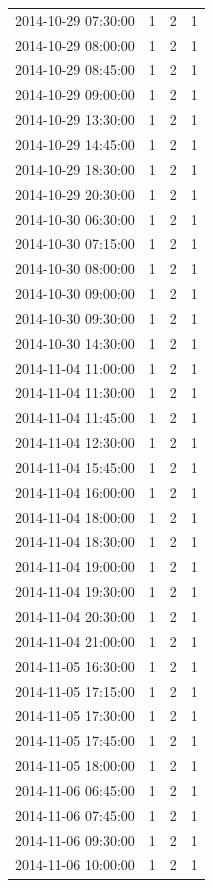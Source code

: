 \begin{tabular}{lrrr}
2014-10-29 07:30:00 & 1 & 2 & 1 \\
2014-10-29 08:00:00 & 1 & 2 & 1 \\
2014-10-29 08:45:00 & 1 & 2 & 1 \\
2014-10-29 09:00:00 & 1 & 2 & 1 \\
2014-10-29 13:30:00 & 1 & 2 & 1 \\
2014-10-29 14:45:00 & 1 & 2 & 1 \\
2014-10-29 18:30:00 & 1 & 2 & 1 \\
2014-10-29 20:30:00 & 1 & 2 & 1 \\
2014-10-30 06:30:00 & 1 & 2 & 1 \\
2014-10-30 07:15:00 & 1 & 2 & 1 \\
2014-10-30 08:00:00 & 1 & 2 & 1 \\
2014-10-30 09:00:00 & 1 & 2 & 1 \\
2014-10-30 09:30:00 & 1 & 2 & 1 \\
2014-10-30 14:30:00 & 1 & 2 & 1 \\
2014-11-04 11:00:00 & 1 & 2 & 1 \\
2014-11-04 11:30:00 & 1 & 2 & 1 \\
2014-11-04 11:45:00 & 1 & 2 & 1 \\
2014-11-04 12:30:00 & 1 & 2 & 1 \\
2014-11-04 15:45:00 & 1 & 2 & 1 \\
2014-11-04 16:00:00 & 1 & 2 & 1 \\
2014-11-04 18:00:00 & 1 & 2 & 1 \\
2014-11-04 18:30:00 & 1 & 2 & 1 \\
2014-11-04 19:00:00 & 1 & 2 & 1 \\
2014-11-04 19:30:00 & 1 & 2 & 1 \\
2014-11-04 20:30:00 & 1 & 2 & 1 \\
2014-11-04 21:00:00 & 1 & 2 & 1 \\
2014-11-05 16:30:00 & 1 & 2 & 1 \\
2014-11-05 17:15:00 & 1 & 2 & 1 \\
2014-11-05 17:30:00 & 1 & 2 & 1 \\
2014-11-05 17:45:00 & 1 & 2 & 1 \\
2014-11-05 18:00:00 & 1 & 2 & 1 \\
2014-11-06 06:45:00 & 1 & 2 & 1 \\
2014-11-06 07:45:00 & 1 & 2 & 1 \\
2014-11-06 09:30:00 & 1 & 2 & 1 \\
2014-11-06 10:00:00 & 1 & 2 & 1 \\

\end{tabular}
